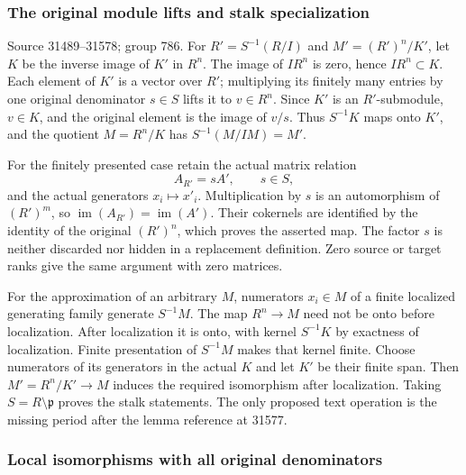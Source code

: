 \subsubsection{The original module lifts and stalk specialization}\label{the-original-module-lifts-and-stalk-specialization}

Source 31489--31578; group 786. For \(R'=S^{-1}(R/I)\) and \(M'=(R')^n/K'\), let \(K\) be the inverse image of \(K'\) in \(R^n\). The image of \(I R^n\) is zero, hence \(IR^n\subset K\). Each element of \(K'\) is a vector over \(R'\); multiplying its finitely many entries by one original denominator \(s\in S\) lifts it to \(v\in R^n\). Since \(K'\) is an \(R'\)-submodule, \(v\in K\), and the original element is the image of \(v/s\). Thus \(S^{-1}K\) maps onto \(K'\), and the quotient \(M=R^n/K\) has \(S^{-1}(M/IM)=M'\).

For the finitely presented case retain the actual matrix relation \[
A_{R'}=sA',\qquad s\in S,
\] and the actual generators \(x_i\mapsto x'_i\). Multiplication by \(s\) is an automorphism of \((R')^m\), so \(\operatorname{im}(A_{R'})=\operatorname{im}(A')\). Their cokernels are identified by the identity of the original \((R')^n\), which proves the asserted map. The factor \(s\) is neither discarded nor hidden in a replacement definition. Zero source or target ranks give the same argument with zero matrices.

For the approximation of an arbitrary \(M\), numerators \(x_i\in M\) of a finite localized generating family generate \(S^{-1}M\). The map \(R^n\to M\) need not be onto before localization. After localization it is onto, with kernel \(S^{-1}K\) by exactness of localization. Finite presentation of \(S^{-1}M\) makes that kernel finite. Choose numerators of its generators in the actual \(K\) and let \(K'\) be their finite span. Then \(M'=R^n/K'\to M\) induces the required isomorphism after localization. Taking \(S=R\setminus\mathfrak p\) proves the stalk statements. The only proposed text operation is the missing period after the lemma reference at 31577.

\subsubsection{Local isomorphisms with all original denominators}\label{local-isomorphisms-with-all-original-denominators}

